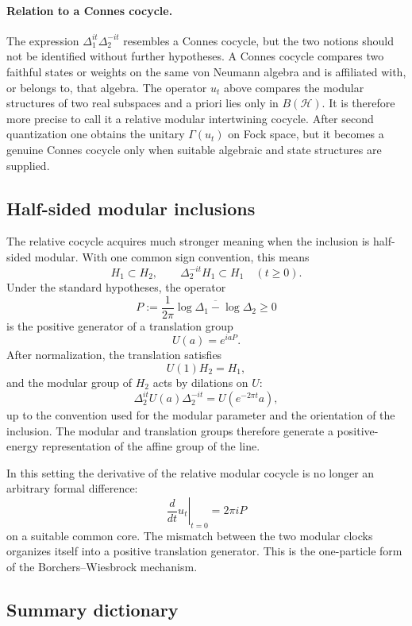 \documentclass[a4paper,11pt]{article}
\theoremstyle{definition}
\newcommand{\cH}{\mathcal{H}}
\begin{document}
\paragraph{Relation to a Connes cocycle.}
The expression $\Delta_1^{it}\Delta_2^{-it}$ resembles a Connes cocycle,
but the two notions should not be identified without further hypotheses.
A Connes cocycle compares two faithful states or weights on the same von
Neumann algebra and is affiliated with, or belongs to, that algebra.  The
operator $u_t$ above compares the modular structures of two real
subspaces and a priori lies only in $B(\cH)$.  It is therefore more precise
to call it a relative modular intertwining cocycle.  After second
quantization one obtains the unitary $\Gamma(u_t)$ on Fock space, but it
becomes a genuine Connes cocycle only when suitable algebraic and state
structures are supplied.

\subsection*{Half-sided modular inclusions}

The relative cocycle acquires much stronger meaning when the inclusion is
half-sided modular.  With one common sign convention, this means
\[
H_1\subset H_2,
\qquad
\Delta_2^{-it}H_1\subset H_1
\quad (t\geq 0).
\]
Under the standard hypotheses, the operator
\[
\boxed{
P
   :=\frac{1}{2\pi}
      \overline{\log\Delta_1-\log\Delta_2}
   \geq 0
}
\]
is the positive generator of a translation group
\[
U(a)=e^{iaP}.
\]
After normalization, the translation satisfies
\[
U(1)H_2=H_1,
\]
and the modular group of $H_2$ acts by dilations on $U$:
\[
\Delta_2^{it}U(a)\Delta_2^{-it}
   =U(e^{-2\pi t}a),
\]
up to the convention used for the modular parameter and the orientation
of the inclusion.  The modular and translation groups therefore generate
a positive-energy representation of the affine group of the line.

In this setting the derivative of the relative modular cocycle is no
longer an arbitrary formal difference:
\[
\left.\frac{d}{dt}u_t\right|_{t=0}
   =2\pi iP
\]
on a suitable common core.  The mismatch between the two modular clocks
organizes itself into a positive translation generator.  This is the
one-particle form of the Borchers--Wiesbrock mechanism.

\subsection*{Summary dictionary}
\end{document}
